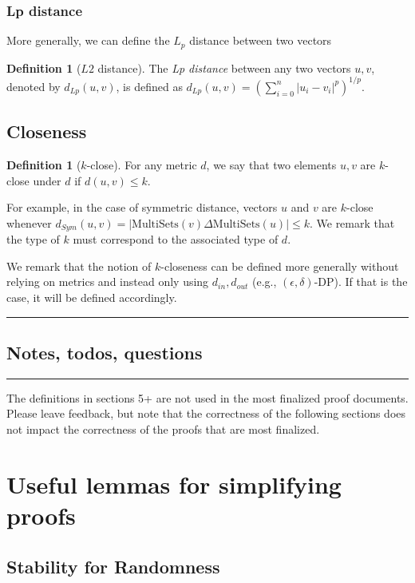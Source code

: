 \documentclass[11pt,a4paper]{article}
\theoremstyle{definition}
\newtheorem{definition}[theorem]{Definition}
\newcommand{\horizline}{\noindent\rule{\textwidth}{1pt}}
\newcommand{\din}{d_{in}}
\newcommand{\dout}{d_{out}}
\begin{document}
\subsubsection{Lp distance}
    More generally, we can define the $L_p$ distance between two vectors
\begin{definition}[$L2$ distance]
    The \textit{Lp distance} between any two vectors $u, v$, denoted by $d_{Lp}(u, v)$, is defined as $d_{Lp}(u, v) = (\sum_{i=0}^n |u_i - v_i|^p)^{1/p}$.
\end{definition}

\subsection{Closeness}
\begin{definition}[$k$-close]
For any metric $d$, we say that two elements $u, v$ are $k$-close under $d$ if $d(u, v) \leq k$.
\end{definition}

For example, in the case of symmetric distance, vectors $u$ and $v$ are $k$-close whenever $d_{Sym}(u, v) = |\textrm{MultiSets}(v) \Delta \textrm{MultiSets}(u)| \leq k$. We remark that the type of $k$ must correspond to the associated type of $d$.

We remark that the notion of $k$-closeness can be defined more generally without relying on metrics and instead only using $\din, \dout$ (e.g., $(\epsilon, \delta)$-DP). If that is the case, it will be defined accordingly.

\horizline

\subsection{Notes, todos, questions}

\horizline

{\Large\color{red} The definitions in sections 5+ are not used in the most finalized proof documents. Please leave feedback, but note that the correctness of the following sections does not impact the correctness of the proofs that are most finalized.}

\section{Useful lemmas for simplifying proofs}

\subsection{Stability for Randomness}
\end{document}
